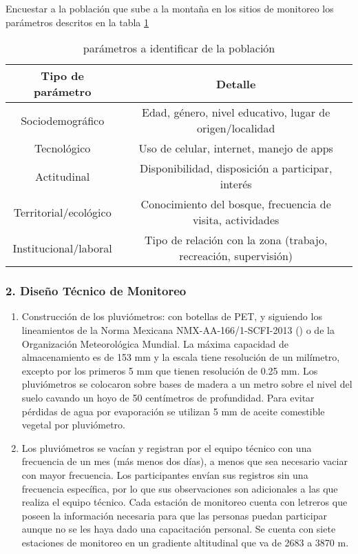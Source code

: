 Encuestar a la población que sube a la montaña en los sitios de monitoreo los parámetros descritos en la tabla \ref{tabt3}
\begin{table}[h!]
\centering
\begin{tabular}{@{}cc@{}}
\toprule
Tipo de parámetro & Detalle                                           \\ \midrule
Sociodemográfico      & Edad, género, nivel educativo, lugar de origen/localidad          \\
Tecnológico       & Uso de celular, internet, manejo de apps          \\
Actitudinal       & Disponibilidad, disposición a participar, interés \\
Territorial/ecológico & Conocimiento del bosque, frecuencia de visita, actividades      \\
Institucional/laboral & Tipo de relación con la zona (trabajo, recreación, supervisión) \\ \bottomrule
\end{tabular}
\caption{parámetros a identificar de la población}
\label{tabt3}
\end{table}
\newpage
\subsubsection{2. Diseño Técnico de Monitoreo}

\begin{enumerate}
    \item Construcción de los pluviómetros: con botellas de PET, y siguiendo los lineamientos de la Norma Mexicana NMX-AA-166/1-SCFI-2013 (\cite{se2013}) o de la Organización Meteorológica Mundial. La máxima capacidad de almacenamiento es de 153 mm y la escala tiene resolución de un milímetro, excepto por los primeros 5 mm que tienen resolución de 0.25 mm. Los pluviómetros se colocaron sobre bases de madera a un metro sobre el nivel del suelo cavando un hoyo de 50 centímetros de profundidad. Para evitar pérdidas de agua por evaporación se utilizan 5 mm de aceite comestible vegetal por pluviómetro.

    \item Los pluviómetros se vacían y registran por el equipo técnico con una frecuencia de un mes (más menos dos días), a menos que sea necesario vaciar con mayor frecuencia. Los participantes envían sus registros sin una frecuencia específica, por lo que sus observaciones son adicionales a las que realiza el equipo técnico. Cada estación de monitoreo cuenta con letreros que poseen la información necesaria para que las personas puedan participar aunque no se les haya dado una capacitación personal. Se cuenta con siete estaciones de monitoreo en un gradiente altitudinal que va de 2683 a 3870 m. 
\end{enumerate}


